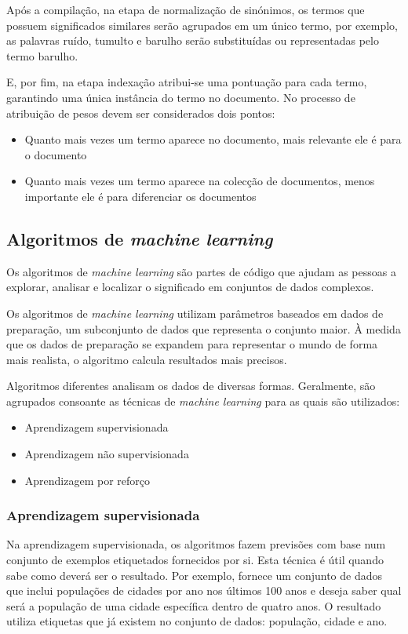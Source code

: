Após a compilação, na etapa de normalização de sinónimos, os termos que possuem significados similares serão agrupados em um único termo, por exemplo, as palavras ruído, tumulto e barulho serão substituídas ou representadas pelo termo barulho.

E, por fim, na etapa indexação atribui-se uma pontuação para cada termo, garantindo uma única instância do termo no documento.
No processo de atribuição de pesos devem ser considerados dois pontos:
\begin{itemize}
  \setlength\itemsep{0.05em}
  \item Quanto mais vezes um termo aparece no documento, mais relevante ele é para o documento
  \item Quanto mais vezes um termo aparece na colecção de documentos, menos importante ele é para diferenciar os documentos
\end{itemize}

\subsection{Algoritmos de \textit{machine learning}}

Os algoritmos de \textit{machine learning} são partes de código que ajudam as pessoas a explorar, analisar e localizar o significado em conjuntos de dados complexos.

Os algoritmos de \textit{machine learning} utilizam parâmetros baseados em dados de preparação, um subconjunto de dados que representa o conjunto maior.
À medida que os dados de preparação se expandem para representar o mundo de forma mais realista, o algoritmo calcula resultados mais precisos.

Algoritmos diferentes analisam os dados de diversas formas.
Geralmente, são agrupados consoante as técnicas de \textit{machine learning} para as quais são utilizados:
\begin{itemize}
  \setlength\itemsep{0.05em}
  \item Aprendizagem supervisionada
  \item Aprendizagem não supervisionada
  \item Aprendizagem por reforço
\end{itemize}

\subsubsection{Aprendizagem supervisionada}

Na aprendizagem supervisionada, os algoritmos fazem previsões com base num conjunto de exemplos etiquetados fornecidos por si.
Esta técnica é útil quando sabe como deverá ser o resultado.
Por exemplo, fornece um conjunto de dados que inclui populações de cidades por ano nos últimos 100 anos e deseja saber qual será a população de uma cidade específica dentro de quatro anos.
O resultado utiliza etiquetas que já existem no conjunto de dados: população, cidade e ano.

